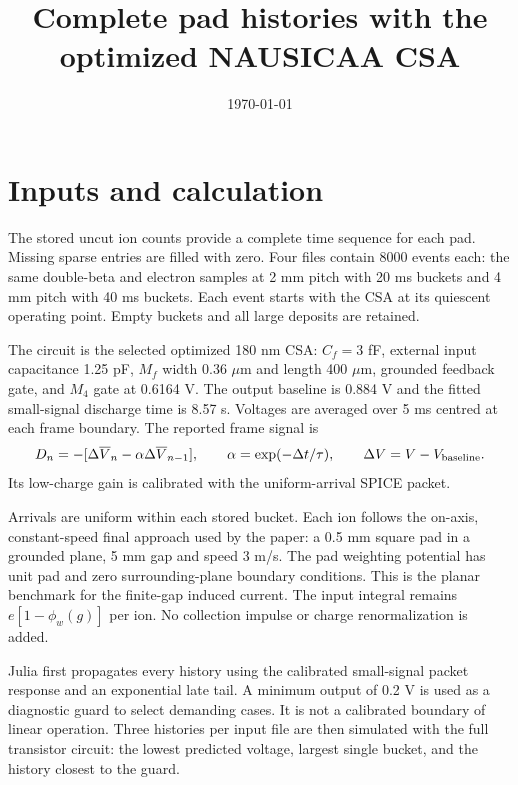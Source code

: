 \documentclass[11pt,a4paper]{article}
\title{Complete pad histories with the optimized NAUSICAA CSA}
\date{\today}
\begin{document}
\maketitle
\section{Inputs and calculation}
The stored uncut ion counts provide a complete time sequence for each pad.
Missing sparse entries are filled with zero. Four files contain 8000 events each:
the same double-beta and electron samples at 2 mm pitch with 20 ms buckets and
4 mm pitch with 40 ms buckets. Each event starts with the CSA at its quiescent
operating point. Empty buckets and all large deposits are retained.

The circuit is the selected optimized 180 nm CSA: $C_f=3$ fF, external input
capacitance 1.25 pF, $M_f$ width 0.36 $\mu$m and length 400 $\mu$m, grounded
feedback gate, and $M_4$ gate at 0.6164 V. The output baseline is 0.884 V
and the fitted small-signal discharge time is 8.57 s.
Voltages are averaged over 5 ms centred at each frame boundary. The reported
frame signal is
\begin{equation}
 D_n=-[\Delta\overline V_n-\alpha\Delta\overline V_{n-1}],\qquad
 \alpha=\exp(-\Delta t/\tau),\qquad \Delta V=V-V_{\rm baseline}.
\end{equation}
Its low-charge gain is calibrated with the uniform-arrival SPICE packet.

Arrivals are uniform within each stored bucket. Each ion follows the on-axis,
constant-speed final approach used by the paper: a 0.5 mm square pad in a grounded
plane, 5 mm gap and speed 3 m/s. The pad weighting potential has unit pad and zero
surrounding-plane boundary conditions. This is the planar benchmark for the
finite-gap induced current. The input integral remains
$e[1-\phi_w(g)]$ per ion. No collection impulse or charge renormalization is added.

Julia first propagates every history using the calibrated small-signal packet
response and an exponential late tail. A minimum output of 0.2 V is used as a
diagnostic guard to select demanding cases. It is not a calibrated boundary of
linear operation. Three histories per input file are then simulated with the
full transistor circuit: the lowest predicted voltage, largest single bucket,
and the history closest to the guard.
\end{document}
